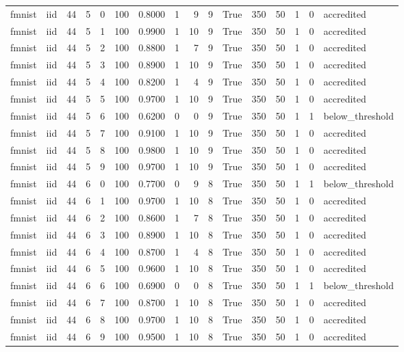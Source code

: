 \begin{tabular}{llrrrrrrrrrrrrrl}
fmnist & iid & 44 & 5 & 0 & 100 & 0.8000 & 1 & 9 & 9 & True & 350 & 50 & 1 & 0 & accredited \\
fmnist & iid & 44 & 5 & 1 & 100 & 0.9900 & 1 & 10 & 9 & True & 350 & 50 & 1 & 0 & accredited \\
fmnist & iid & 44 & 5 & 2 & 100 & 0.8800 & 1 & 7 & 9 & True & 350 & 50 & 1 & 0 & accredited \\
fmnist & iid & 44 & 5 & 3 & 100 & 0.8900 & 1 & 10 & 9 & True & 350 & 50 & 1 & 0 & accredited \\
fmnist & iid & 44 & 5 & 4 & 100 & 0.8200 & 1 & 4 & 9 & True & 350 & 50 & 1 & 0 & accredited \\
fmnist & iid & 44 & 5 & 5 & 100 & 0.9700 & 1 & 10 & 9 & True & 350 & 50 & 1 & 0 & accredited \\
fmnist & iid & 44 & 5 & 6 & 100 & 0.6200 & 0 & 0 & 9 & True & 350 & 50 & 1 & 1 & below\_threshold \\
fmnist & iid & 44 & 5 & 7 & 100 & 0.9100 & 1 & 10 & 9 & True & 350 & 50 & 1 & 0 & accredited \\
fmnist & iid & 44 & 5 & 8 & 100 & 0.9800 & 1 & 10 & 9 & True & 350 & 50 & 1 & 0 & accredited \\
fmnist & iid & 44 & 5 & 9 & 100 & 0.9700 & 1 & 10 & 9 & True & 350 & 50 & 1 & 0 & accredited \\
fmnist & iid & 44 & 6 & 0 & 100 & 0.7700 & 0 & 9 & 8 & True & 350 & 50 & 1 & 1 & below\_threshold \\
fmnist & iid & 44 & 6 & 1 & 100 & 0.9700 & 1 & 10 & 8 & True & 350 & 50 & 1 & 0 & accredited \\
fmnist & iid & 44 & 6 & 2 & 100 & 0.8600 & 1 & 7 & 8 & True & 350 & 50 & 1 & 0 & accredited \\
fmnist & iid & 44 & 6 & 3 & 100 & 0.8900 & 1 & 10 & 8 & True & 350 & 50 & 1 & 0 & accredited \\
fmnist & iid & 44 & 6 & 4 & 100 & 0.8700 & 1 & 4 & 8 & True & 350 & 50 & 1 & 0 & accredited \\
fmnist & iid & 44 & 6 & 5 & 100 & 0.9600 & 1 & 10 & 8 & True & 350 & 50 & 1 & 0 & accredited \\
fmnist & iid & 44 & 6 & 6 & 100 & 0.6900 & 0 & 0 & 8 & True & 350 & 50 & 1 & 1 & below\_threshold \\
fmnist & iid & 44 & 6 & 7 & 100 & 0.8700 & 1 & 10 & 8 & True & 350 & 50 & 1 & 0 & accredited \\
fmnist & iid & 44 & 6 & 8 & 100 & 0.9700 & 1 & 10 & 8 & True & 350 & 50 & 1 & 0 & accredited \\
fmnist & iid & 44 & 6 & 9 & 100 & 0.9500 & 1 & 10 & 8 & True & 350 & 50 & 1 & 0 & accredited \\

\end{tabular}
